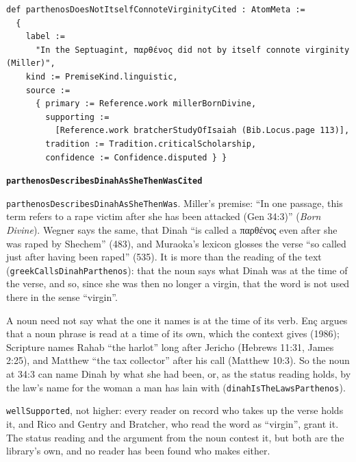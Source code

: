 \documentclass[11pt]{article}
\begin{document}
{\small\begin{verbatim}
def parthenosDoesNotItselfConnoteVirginityCited : AtomMeta :=
  {
    label :=
      "In the Septuagint, παρθένος did not by itself connote virginity (Miller)",
    kind := PremiseKind.linguistic,
    source :=
      { primary := Reference.work millerBornDivine,
        supporting :=
          [Reference.work bratcherStudyOfIsaiah (Bib.Locus.page 113)],
        tradition := Tradition.criticalScholarship,
        confidence := Confidence.disputed } }
\end{verbatim}}
\par\medskip\noindent\textbf{\texttt{parthenos\allowbreak{}Describes\allowbreak{}Dinah\allowbreak{}As\allowbreak{}She\allowbreak{}Then\allowbreak{}Was\allowbreak{}Cited}}\par\nobreak\noindent
\texttt{parthenos\allowbreak{}Describes\allowbreak{}Dinah\allowbreak{}As\allowbreak{}She\allowbreak{}Then\allowbreak{}Was}. Miller’s premise: “In one passage, this term refers to a rape victim after she has been attacked (Gen 34:3)” (\emph{Born Divine}). Wegner says the same, that Dinah “is called a παρθένος even after she was raped by Shechem” (483), and Muraoka’s lexicon glosses the verse “so called just after having been raped” (535). It is more than the reading of the text (\texttt{greek\allowbreak{}Calls\allowbreak{}Dinah\allowbreak{}Parthenos}): that the noun says what Dinah was at the time of the verse, and so, since she was then no longer a virgin, that the word is not used there in the sense “virgin”.

A noun need not say what the one it names is at the time of its verb. Enç argues that a noun phrase is read at a time of its own, which the context gives (1986); Scripture names Rahab “the harlot” long after Jericho (Hebrews 11:31, James 2:25), and Matthew “the tax collector” after his call (Matthew 10:3). So the noun at 34:3 can name Dinah by what she had been, or, as the status reading holds, by the law’s name for the woman a man has lain with (\texttt{dinah\allowbreak{}Is\allowbreak{}The\allowbreak{}Laws\allowbreak{}Parthenos}).

\texttt{well\allowbreak{}Supported}, not higher: every reader on record who takes up the verse holds it, and Rico and Gentry and Bratcher, who read the word as “virgin”, grant it. The status reading and the argument from the noun contest it, but both are the library’s own, and no reader has been found who makes either.
\end{document}
